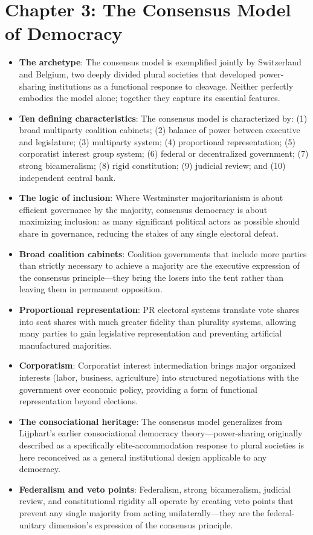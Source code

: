 \documentclass[12pt]{article}
\begin{document}
\section{Chapter 3: The Consensus Model of Democracy}

\begin{itemize}[leftmargin=*, itemsep=4pt]
    \item \textbf{The archetype}: The consensus model is exemplified jointly by Switzerland and Belgium, two deeply divided plural societies that developed power-sharing institutions as a functional response to cleavage. Neither perfectly embodies the model alone; together they capture its essential features.
    \item \textbf{Ten defining characteristics}: The consensus model is characterized by: (1) broad multiparty coalition cabinets; (2) balance of power between executive and legislature; (3) multiparty system; (4) proportional representation; (5) corporatist interest group system; (6) federal or decentralized government; (7) strong bicameralism; (8) rigid constitution; (9) judicial review; and (10) independent central bank.
    \item \textbf{The logic of inclusion}: Where Westminster majoritarianism is about efficient governance by the majority, consensus democracy is about maximizing inclusion: as many significant political actors as possible should share in governance, reducing the stakes of any single electoral defeat.
    \item \textbf{Broad coalition cabinets}: Coalition governments that include more parties than strictly necessary to achieve a majority are the executive expression of the consensus principle---they bring the losers into the tent rather than leaving them in permanent opposition.
    \item \textbf{Proportional representation}: PR electoral systems translate vote shares into seat shares with much greater fidelity than plurality systems, allowing many parties to gain legislative representation and preventing artificial manufactured majorities.
    \item \textbf{Corporatism}: Corporatist interest intermediation brings major organized interests (labor, business, agriculture) into structured negotiations with the government over economic policy, providing a form of functional representation beyond elections.
    \item \textbf{The consociational heritage}: The consensus model generalizes from Lijphart's earlier consociational democracy theory---power-sharing originally described as a specifically elite-accommodation response to plural societies is here reconceived as a general institutional design applicable to any democracy.
    \item \textbf{Federalism and veto points}: Federalism, strong bicameralism, judicial review, and constitutional rigidity all operate by creating veto points that prevent any single majority from acting unilaterally---they are the federal-unitary dimension's expression of the consensus principle.
\end{itemize}
\end{document}

